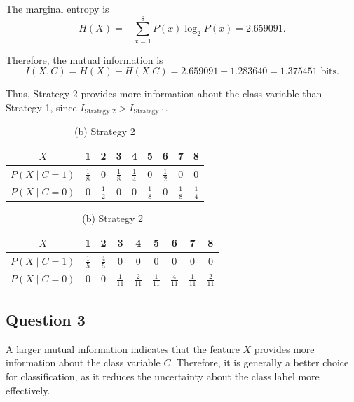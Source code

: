 \documentclass[10pt,a4paper]{article}
\begin{document}
		The marginal entropy is
		\[
		H(X)=-\sum_{x=1}^{8}P(x)\log_2P(x)
		=2.659091.
		\]
		
		Therefore, the mutual information is
		\[
		I(X,C)=H(X)-H(X|C)
		=2.659091-1.283640
		=\boxed{1.375451\text{ bits}}.
		\]
		
		Thus, Strategy 2 provides more information about the class variable
		than Strategy 1, since
		$I_{\text{Strategy 2}}>I_{\text{Strategy 1}}$.
		
		\begin{table}[H]
			\centering
			\caption{Conditional Probability Distributions of Two Strategies}
			\label{tab:strategy_probabilities}
			
			\begin{tabular}{c|cccccccc}
				\hline
				$X$ & 1 & 2 & 3 & 4 & 5 & 6 & 7 & 8 \\
				\hline
				$P(X \mid C=1)$
				& $\frac{1}{8}$ & 0 & $\frac{1}{8}$ & $\frac{1}{4}$
				& 0 & $\frac{1}{2}$ & 0 & 0 \\
				
				$P(X \mid C=0)$
				& 0 & $\frac{1}{2}$ & 0 & 0
				& $\frac{1}{8}$ & 0 & $\frac{1}{8}$ & $\frac{1}{4}$ \\
				\hline
			\end{tabular}
			
			\vspace{0.5cm}
			
			\caption*{(a) Strategy 1}
			
			\vspace{0.3cm}
			
			\begin{tabular}{c|cccccccc}
				\hline
				$X$ & 1 & 2 & 3 & 4 & 5 & 6 & 7 & 8 \\
				\hline
				$P(X \mid C=1)$
				& $\frac{1}{5}$ & $\frac{4}{5}$ & 0 & 0
				& 0 & 0 & 0 & 0 \\
				
				$P(X \mid C=0)$
				& 0 & 0 & $\frac{1}{11}$ & $\frac{2}{11}$
				& $\frac{1}{11}$ & $\frac{4}{11}$ & $\frac{1}{11}$ & $\frac{2}{11}$ \\
				\hline
			\end{tabular}
			
			\caption*{(b) Strategy 2}
		\end{table}
		\subsection{Question 3}
		A larger mutual information indicates that the feature $X$ provides
		more information about the class variable $C$. Therefore, it is
		generally a better choice for classification, as it reduces the
		uncertainty about the class label more effectively.
		
\end{document}
